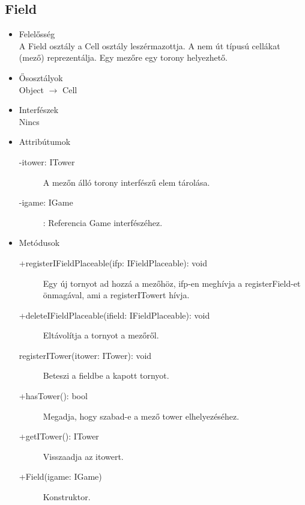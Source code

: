\subsection{Field}
\begin{itemize}
\item Felelősség\\
A Field osztály a Cell osztály leszérmazottja. A nem út típusú cellákat (mező) reprezentálja. Egy mezőre egy torony helyezhető.
\item Ősosztályok\\
Object $\rightarrow$ Cell
\item Interfészek\\
Nincs
\item Attribútumok\\
	\begin{description}
		\item[-itower: ITower] A mezőn álló torony interfészű elem tárolása.  
		\item[-igame: IGame]: Referencia Game interfészéhez.

		
	\end{description}
\item Metódusok\\
	\begin{description}
		
		
		\item[+registerIFieldPlaceable(ifp: IFieldPlaceable): void] Egy új tornyot ad hozzá a mezőhöz, ifp-en meghívja a registerField-et önmagával, ami a registerITowert hívja. 
		\item[+deleteIFieldPlaceable(ifield: IFieldPlaceable): void] Eltávolítja a tornyot a mezőről. 
		\item[registerITower(itower: ITower): void] Beteszi a fieldbe a kapott tornyot. 
		\item[+hasTower(): bool] Megadja, hogy szabad-e a mező tower elhelyezéséhez. 
		\item[+getITower(): ITower] Visszaadja az itowert. 
		\item[+Field(igame: IGame)] Konstruktor. 
		
		
	\end{description}
\end{itemize}



